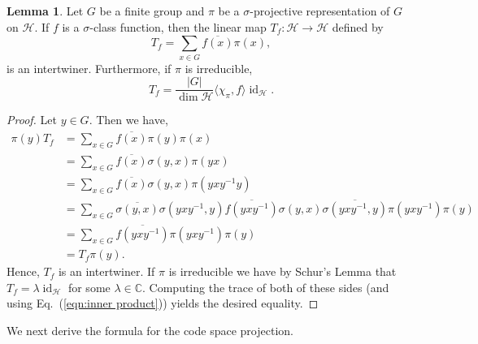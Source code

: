 \documentclass[11pt]{article}
\theoremstyle{definition}
\newtheorem{lemma}{Lemma}
\newcommand{\bbC}{\mathbb{C}}
\newcommand{\calH}{\mathcal{H}}
\newcommand{\id}{\operatorname{id}}
\begin{document}
\begin{lemma}\label{lemma:intertwiners from class functions}
    Let $G$ be a finite group and $\pi$ be a $\sigma$-projective representation of $G$ on $\calH$. If $f$ is a $\sigma$-class function, then the linear map $T_f \colon \calH \to \calH$ defined by
    \begin{equation*}
        T_f = \sum_{x \in G}\overline{f(x)}\pi(x),
    \end{equation*}
    is an intertwiner. Furthermore, if $\pi$ is irreducible,
    \begin{equation*}
        T_f = \frac{|G|}{\dim\calH}\langle \chi_\pi, f \rangle \id_\calH.
    \end{equation*}
\end{lemma}
\begin{proof}
    Let $y \in G$. Then we have, 
    \begin{align*}
        \pi(y)T_f
        & = \sum_{x \in G} \overline{f(x)} \pi(y)\pi(x) \\
        & = \sum_{x \in G} \overline{f(x)}\sigma(y,x)\pi(yx) \\
        & = \sum_{x \in G} \overline{f(x)}\sigma(y,x)\pi(yxy^{-1}y) \\
        & = \sum_{x \in G} \overline{\sigma(y,x)}\sigma(yxy^{-1},y)\overline{f(yxy^{-1})}\sigma(y,x)\overline{\sigma(yxy^{-1},y)}\pi(yxy^{-1})\pi(y) \\
        & = \sum_{x \in G} \overline{f(yxy^{-1})}\pi(yxy^{-1})\pi(y) \\
        & = T_f\pi(y).
    \end{align*}
    Hence, $T_f$ is an intertwiner. If $\pi$ is irreducible we have by Schur's Lemma that $T_f = \lambda\id_\calH$ for some $\lambda \in \bbC$. Computing the trace of both of these sides (and using Eq.~(\ref{eqn:inner product})) yields the desired equality.
\end{proof}

We next derive the formula for the code space projection. 
\end{document}
